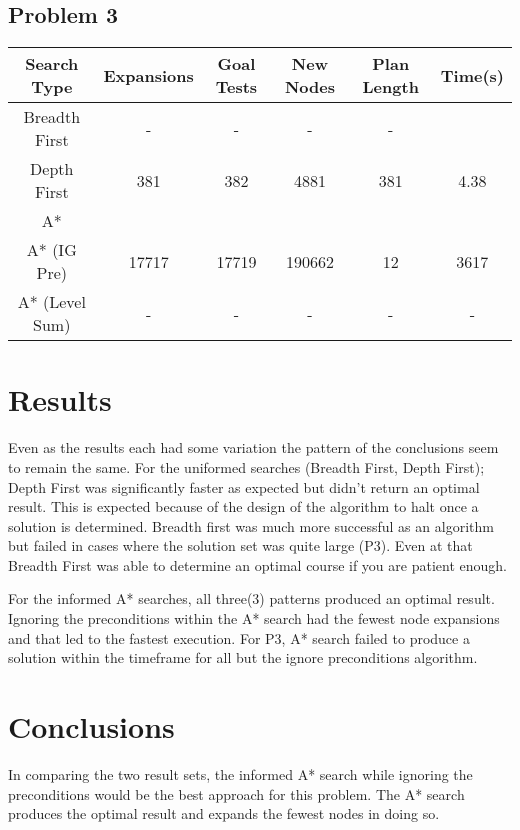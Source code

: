 \documentclass[paper=letter, fontsize=12pt]{article}
\begin{document}
\subsection{Problem 3}
\begin{center}
\begin{tabular}{ |c|c|c|c|c|c| }
 \hline
 Search Type & Expansions & Goal Tests & New Nodes & Plan Length & Time(s) \\
 \hline
 Breadth First & - & - & - &  -&  \\
 Depth First & 381 & 382 & 4881 & 381 & 4.38 \\
 A* &  &  &  &  &  \\
 A* (IG Pre) & 17717 & 17719 & 190662 & 12 & 3617 \\
 A* (Level Sum) & - & - & - & - & - \\
 \hline
\end{tabular}
\end{center}



\section{Results}

Even as the results each had some variation the pattern of the conclusions seem to remain the same. For the uniformed searches (Breadth First, Depth First); Depth First was significantly faster as expected but didn't return an optimal result. This is expected because of the design of the algorithm to halt once a solution is determined. Breadth first was much more successful as an algorithm but failed in cases where the solution set was quite large (P3). Even at that Breadth First was able to determine an optimal course if you are patient enough.

For the informed A* searches, all three(3) patterns produced an optimal result. Ignoring the preconditions within the A* search had the fewest node expansions and that led to the fastest execution. For P3, A* search failed to produce a solution within the timeframe for all but the ignore preconditions algorithm.


\section{Conclusions}
In comparing the two result sets, the informed A* search while ignoring the preconditions would be the best approach for this problem. The A* search produces the optimal result and expands the fewest nodes in doing so.


\end{document}
